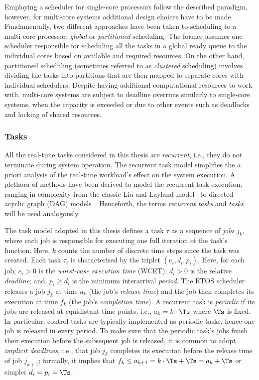 Employing a scheduler for single-core processors follow the described paradigm, however, for multi-core systems additional design choices have to be made.
Fundamentally, two different approaches have been taken to scheduling to a multi-core processor: \emph{global} or \emph{partitioned} scheduling.
The former assumes one scheduler responsible for scheduling all the tasks in a global ready queue to the individual cores based on available and required resources.
On the other hand, partitioned scheduling (sometimes referred to as \emph{clustered} scheduling) involves dividing the tasks into partitions that are then mapped to separate cores with individual schedulers.
Despite having additional computational resources to work with, multi-core systems are subject to deadline overruns similarly to single-core systems, when the capacity is exceeded or due to other events such as deadlocks and locking of shared resources.


\subsubsection*{Tasks}%
All the real-time tasks considered in this thesis are \emph{recurrent}, i.e., they do not terminate during system operation.
The recurrent task model simplifies the a priori analysis of the real-time workload's effect on the system execution.
A plethora of methods have been derived to model the recurrent task execution, ranging in complexity from the classic Liu and Layland model~\cite{Liu:1973} to directed acyclic graph (DAG) models~\cite{Saifullah:2014}.
Henceforth, the terms \emph{recurrent tasks} and \emph{tasks} will be used analogously.

The task model adopted in this thesis defines a task $\tau$ as a sequence of \emph{jobs} $j_k$, where each job is responsible for executing one full iteration of the task's function.
Here, $k$ counts the number of discrete time steps since the task was created.
Each task $\tau_i$ is characterised by the triplet $(e_i, d_i, p_i)$.
Here, for each job; $e_i > 0$ is the \emph{worst-case execution time} (WCET); $d_i > 0$ is the relative \emph{deadline}; and, $p_i \geq d_i$ is the minimum interarrival \emph{period}.
The RTOS scheduler releases a job $j_k$ at time $a_k$ (the job's \emph{release time}) and the job then completes its execution at time $f_k$ (the job's \emph{completion time}).
A recurrent task is \emph{periodic} if its jobs are released at equidistant time points, i.e., $a_k = k\cdot \Ts$ where $\Ts$ is fixed. 
In particular, control tasks are typically implemented as periodic tasks, hence one job is released in every period.
To make sure that the periodic task's jobs finish their execution before the subsequent job is released, it is common to adopt \emph{implicit deadlines}, i.e., that job $j_k$ completes its execution before the release time of job $j_{k+1}$; formally, it implies that $f_k \leq a_{k+1} = k\cdot \Ts+\Ts = a_k + \Ts$ or simpler $d_i = p_i = \Ts$.

